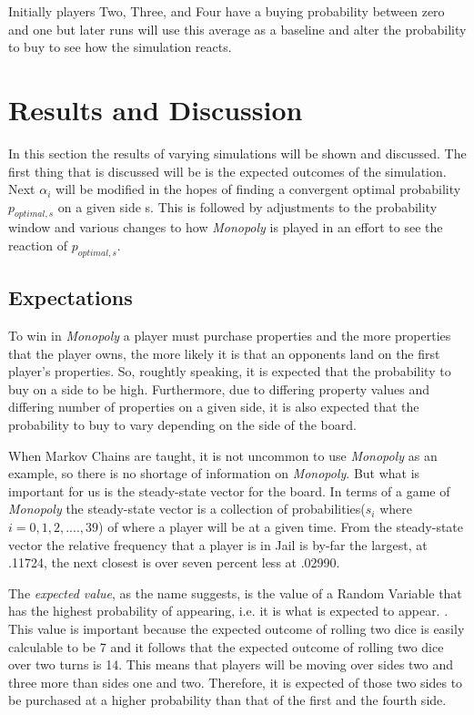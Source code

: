 \documentclass{article}
\begin{document}
Initially players Two, Three, and Four have a buying probability between zero and one but later runs will use this average as a baseline and alter the probability to buy to see how the simulation reacts.

\section{Results and Discussion}

In this section the results of varying simulations will be shown and discussed.  The first thing that is discussed will be is the expected outcomes of the simulation.  Next $\alpha_i$ will be modified in the hopes of finding a convergent optimal probability $p_{optimal,s}$ on a given side s.  This is followed by adjustments to the probability window and various changes to how \textit{Monopoly} is played in an effort to see the reaction of $p_{optimal,s}$.

\subsection{Expectations}

To win in \textit{Monopoly} a player must purchase properties and the more properties that the player owns, the more likely it is that an opponents land on the first player's properties.  So, roughtly speaking, it is expected that the probability to buy on a side to be high.  Furthermore, due to differing property values and differing number of properties on a given side, it is also expected that the probability to buy to vary depending on the side of the board.

When Markov Chains are taught, it is not uncommon to use \textit{Monopoly} as an example, so there is no shortage of information on \textit{Monopoly}.  But what is important for us is the steady-state vector for the board.  In terms of a game of \textit{Monopoly} the steady-state vector is a collection of probabilities($s_i$ where $i = 0,1,2,....,39$) of where a player will be at a given time.  From the steady-state vector the relative frequency that a player is in Jail is by-far the largest, at .11724, the next closest is over seven percent less at .02990.\cite{dartmouth}

The \textit{expected value}, as the name suggests, is the value of a Random Variable that has the highest probability of appearing, i.e. it is what is expected to appear. \cite{montecarlo}. This value is important because the expected outcome of rolling two dice is easily calculable to be 7 and it follows that the expected outcome of rolling two dice over two turns is 14.  This means that players will be moving over sides two and three more than sides one and two.  Therefore, it is expected of those two sides to be purchased at a higher probability than that of the first and the fourth side.
\end{document}

